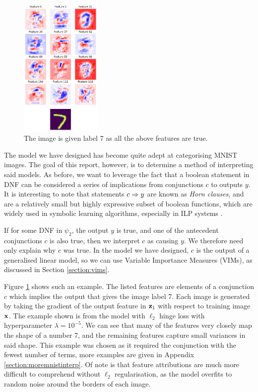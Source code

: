 \begin{figure}
    \centering
    \vspace{-35.0pt}
    \includegraphics[width=0.35\textwidth]{imgs/interpret7.png}
    \vspace{10.0pt}
    \caption[width=0.3\textwidth]{The image is given label 7 as all the above features are true.}
    \label{fig:interpret7}
\end{figure}

The model we have designed has become quite adept at categorising MNIST images. The goal of this report, however, is to determine a method of interpreting said models. As before, we want to leverage the fact that a boolean statement in DNF can be considered a series of implications from conjunctions $c$ to outputs $y$. It is interesting to note that statements $c \Rightarrow y$ are known as \textit{Horn clauses}, and are a relatively small but highly expressive subset of boolean functions, which are widely used in symbolic learning algorithms, especially in ILP systems \cite{hornclause}. 

If for some DNF in $\psi_2$, the output $y$ is true, and one of the antecedent conjunctions $c$ is also true, then we interpret $c$ as causing $y$. We therefore need only explain why $c$ was true. In the model we have designed, $c$ is the output of a generalised linear model, so we can use Variable Importance Measures (VIMs), as discussed in Section \ref{section:vims}. 

Figure \ref{fig:interpret7} shows such an example. The listed features are elements of a conjunction $c$ which implies the output that gives the image label 7. Each image is generated by taking the gradient of the output feature in $\mathbf{z}_1$ with respect to training image $\mathbf{x}$. The example shown is from the model with $\ell_2$ hinge loss with hyperparameter $\lambda = 10^{-5}$. We can see that many of the features very closely map the shape of a number 7, and the remaining features capture small variances in said shape. This example was chosen as it required the conjunction with the fewest number of terms, more examples are given in Appendix \ref{section:moremnistinterp}. Of note is that feature attributions are much more difficult to comprehend without $\ell_2$ regularisation, as the model overfits to random noise around the borders of each image.

